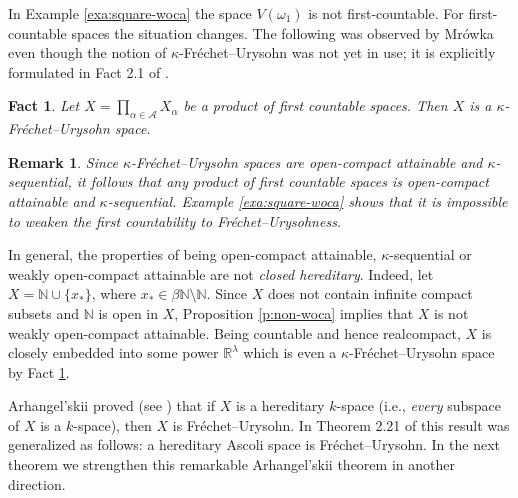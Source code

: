 \documentclass[preprint,11pt]{elsarticle}
\newtheorem{remark}[theorem]{Remark}
\newtheorem{example}[theorem]{Example}
\newtheorem{fact}[theorem]{Fact}
\numberwithin{equation}{section}
\numberwithin{theorem}{section}
\newcommand{\w}{\omega}
\newcommand{\NN}{\mathbb{N}}
\newcommand{\IR}{\mathbb{R}}
\newcommand{\AAA}{\mathcal{A}}
\newcommand{\SM}{{\setminus}}
\begin{document}


In Example \ref{exa:square-woca} the space $V(\w_1)$ is not first-countable. For first-countable spaces the situation changes.
The following was observed by Mr\'{o}wka \cite[Theorem~3.1]{Mrowka}  even though the notion of $\kappa$-Fr\'{e}chet--Urysohn was not yet in use; it is explicitly formulated in Fact 2.1 of \cite{LiL}.

\begin{fact} \label{f:product-kFU}
Let $X=\prod_{\alpha\in \AAA}X_\alpha$ be a product of first countable spaces. Then $X$ is a  $\kappa$-Fr\'{e}chet--Urysohn space.
\end{fact}

\begin{remark}{\em
Since $\kappa$-Fr\'{e}chet--Urysohn spaces are  open-compact attainable and $\kappa$-sequential, it follows that any product of first countable spaces is open-compact attainable and $\kappa$-sequential. Example \ref{exa:square-woca}  shows that it is impossible to weaken the first countability to Fr\'{e}chet--Urysohness.}
\end{remark}



In general, the properties of being open-compact attainable, $\kappa$-sequential or weakly open-compact attainable are not {\em closed hereditary}. Indeed, let $X=\NN\cup\{x_\ast\}$, where $x_\ast\in\beta\NN\SM\NN$. Since $X$ does not contain infinite compact subsets and $\NN$ is open in $X$, Proposition \ref{p:non-woca} implies that $X$ is not weakly open-compact attainable. Being countable and hence realcompact, $X$ is closely embedded into some power $\IR^\lambda$ which is even a  $\kappa$-Fr\'{e}chet--Urysohn space  by Fact \ref{f:product-kFU}.

Arhangel'skii proved (see \cite[3.12.15]{Eng}) that if $X$ is a hereditary $k$-space (i.e., {\em every} subspace of $X$ is a $k$-space), then $X$ is Fr\'{e}chet--Urysohn. In Theorem 2.21 of \cite{Gabr-seq-Ascoli} this result was generalized as follows: a hereditary Ascoli space is Fr\'{e}chet--Urysohn. In the next theorem we strengthen this remarkable Arhangel'skii theorem in another direction.
\end{document}
